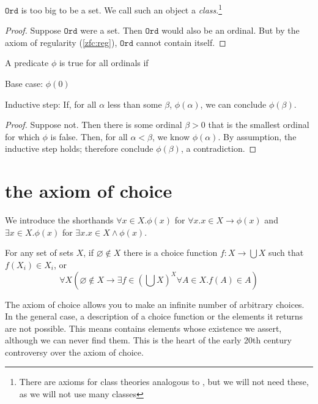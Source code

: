 \message{ !name(truth.tex)}\documentclass{scrbook}
\renewcommand{\implies}{\to}
\newcommand{\ord}{\texttt{Ord}}
\renewcommand{\emptyset}{\varnothing}
\begin{document}
\begin{theorem}[$\ord$ is too big to be a set]\label{th:ord-proper-class}
  $\ord$ is too big to be a set. We call such an object a \emph{class}.\footnote{There are axioms for class theories analogous to \zfc, but we will not need these, as we will not use many classes}
\end{theorem}
\begin{proof}
  Suppose $\ord$ were a set. Then $\ord$ would also be an ordinal. But by the axiom of regularity (\ref{zfc:reg}), $\ord$ cannot contain itself. 
\end{proof}
\begin{theorem}\label{def:trans-ind}
  A predicate $\phi$ is true for all ordinals if
  \begin{trivlist}
  \item Base case: $\phi(0)$
  \item Inductive step: If, for all $\alpha$ less than some $\beta$, $\phi(\alpha)$, we can conclude $\phi(\beta)$. 
  \end{trivlist}
\end{theorem}
\begin{proof}
  Suppose not. Then there is some ordinal $\beta>0$ that is the smallest ordinal for which $\phi$ is false. Then, for all $\alpha < \beta$, we know $\phi(\alpha)$. By assumption, the inductive step holds; therefore conclude $\phi(\beta)$, a contradiction. 
\end{proof}
\section[The axiom of choice]{the axiom of choice}
We introduce the shorthands $\forall x \in X . \phi(x)$ for $\forall x . x\in X \implies \phi(x)$ and $\exists x \in X.\phi(x)$ for $\exists x . x\in X \wedge \phi(x)$. 
\begin{defn} \label{choice}
  For any set of sets $X$, if $\emptyset \notin X$ there is a choice function $f:X\to \bigcup X$ such that $f(X_i)\in X_i$, or 
\begin{equation}
\forall X \left(\emptyset \notin X \implies \exists f \in \left(\bigcup X\right)^X \forall A \in X . f(A)\in A\right)
\label{eq:choice}
\end{equation}
\end{defn}
The axiom of choice allows you to make an infinite number of arbitrary choices. In the general case, a description of a choice function or the elements it returns are not possible. This means \zfc contains elements whose existence we assert, although we can never find them. This is the heart of the early 20th century controversy over the axiom of choice. 
\end{document}
